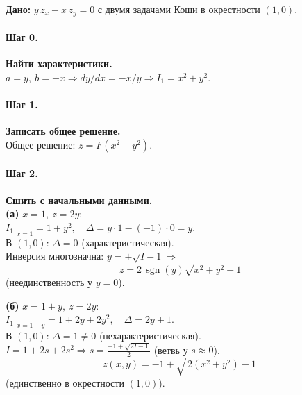 \textbf{Дано:} \(y\,z_x-x\,z_y=0\) с двумя задачами Коши в окрестности \((1,0)\).

\paragraph{Шаг 0.} \textbf{Найти характеристики.}\\
\(a=y,\ b=-x\Rightarrow dy/dx=-x/y\Rightarrow I_1=x^2+y^2\).

\paragraph{Шаг 1.} \textbf{Записать общее решение.}\\
Общее решение: \(z=F(x^2+y^2)\).

\paragraph{Шаг 2.} \textbf{Сшить с начальными данными.}\\
\textbf{(а) }\(x=1,\ z=2y\):\\
\(I_1|_{x=1}=1+y^2,\quad \Delta=y\cdot1-(-1)\cdot0=y\).\\
В \((1,0)\): \(\Delta=0\) (характеристическая).\\
Инверсия многозначна: \(y=\pm\sqrt{I-1}\Rightarrow\)
\[
\boxed{\,z=2\,\operatorname{sgn}(y)\sqrt{x^2+y^2-1}\,}
\]
(неединственность у \(y=0\)).

\textbf{(б) }\(x=1+y,\ z=2y\):\\
\(I_1|_{x=1+y}=1+2y+2y^2,\quad \Delta=2y+1\).\\
В \((1,0)\): \(\Delta=1\neq0\) (нехарактеристическая).\\
\(I=1+2s+2s^2\Rightarrow s=\frac{-1+\sqrt{2I-1}}{2}\) (ветвь у \(s\approx0\)).
\[
\boxed{\,z(x,y)=-1+\sqrt{\,2(x^2+y^2)-1\,}\,}
\]
(единственно в окрестности \((1,0)\)).

